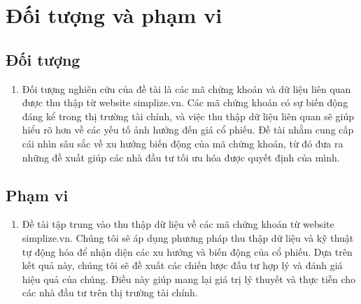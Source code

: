 \section{Đối tượng và phạm vi}
\subsection{Đối tượng}
\begin{enumerate}
    \item []
    \hspace*{0.7cm}Đối tượng nghiên cứu của đề tài là các mã chứng khoán và dữ liệu liên quan được thu thập từ website simplize.vn. Các mã chứng khoán có sự biến động đáng kể trong thị trường tài chính, và việc thu thập dữ liệu liên quan sẽ giúp hiểu rõ hơn về các yếu tố ảnh hưởng đến giá cổ phiếu. Đề tài nhằm cung cấp cái nhìn sâu sắc về xu hướng biến động của mã chứng khoán, từ đó đưa ra những đề xuất giúp các nhà đầu tư tối ưu hóa được quyết định của mình. 
\end{enumerate}

\subsection{Phạm vi}
\begin{enumerate}
    \item []
    \hspace*{0.7cm}Đề tài tập trung vào thu thập dữ liệu về các mã chứng khoán từ website simplize.vn. Chúng tôi sẽ áp dụng phương pháp thu thập dữ liệu và kỹ thuật tự động hóa để nhận diện các xu hướng và biến động của cổ phiếu. Dựa trên kết quả này, chúng tôi sẽ đề xuất các chiến lược đầu tư hợp lý và đánh giá hiệu quả của chúng. Điều này giúp mang lại giá trị lý thuyết và thực tiễn cho các nhà đầu tư trên thị trường tài chính.
\end{enumerate}